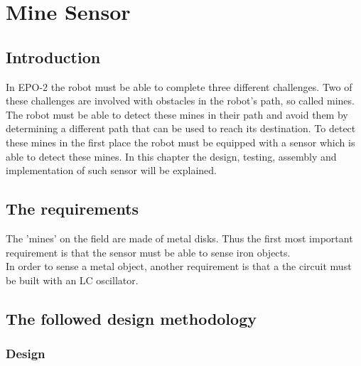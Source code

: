 \chapter{Mine Sensor}



\section{Introduction}

In EPO-2 the robot must be able to complete three different challenges. Two of these challenges are involved with obstacles in the robot's path, so called mines. The robot must be able to detect these mines in their path and avoid them by determining a different path that can be used to reach its destination. To detect these mines in the first place the robot must be equipped with a sensor which is able to detect these mines. In this chapter the design, testing, assembly and implementation of such sensor will be explained.

\section{The requirements}
The 'mines' on the field are made of metal disks.
Thus the first most important requirement is that the sensor must be able to sense iron objects.\\
In order to sense a metal object, another requirement is that a the circuit must be built with an LC oscillator.

\newpage
\section{The followed design methodology}
\subsection{Design}






